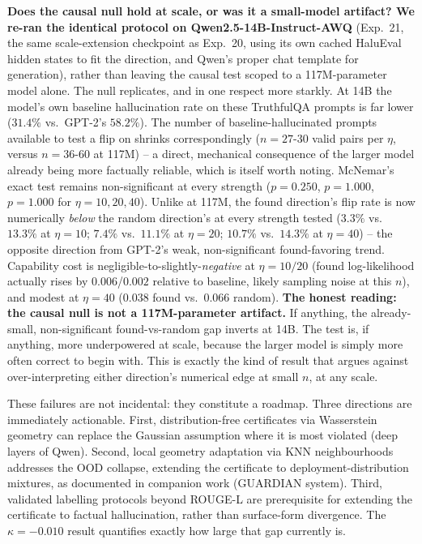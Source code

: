 \documentclass[10pt,twocolumn]{article}
\begin{document}
\textbf{Does the causal null hold at scale, or was it a small-model
artifact? We re-ran the identical protocol on Qwen2.5-14B-Instruct-AWQ}
(Exp.~21, the same scale-extension checkpoint as Exp.~20, using its
own cached HaluEval hidden states to fit the direction, and Qwen's
proper chat template for generation), rather than leaving the causal
test scoped to a 117M-parameter model alone. The null replicates, and
in one respect more starkly. At 14B the model's own baseline
hallucination rate on these TruthfulQA prompts is far lower ($31.4\%$
vs.\ GPT-2's $58.2\%$). The number of baseline-hallucinated prompts
available to test a flip on shrinks correspondingly ($n=27$-$30$ valid
pairs per $\eta$, versus $n=36$-$60$ at 117M) -- a direct, mechanical
consequence of the larger model already being more factually
reliable, which is itself worth noting. McNemar's exact test remains
non-significant at every strength ($p=0.250$, $p=1.000$, $p=1.000$ for
$\eta=10,20,40$). Unlike at 117M, the found direction's flip rate is
now numerically \emph{below} the random direction's at every strength
tested ($3.3\%$ vs.\ $13.3\%$ at $\eta=10$; $7.4\%$ vs.\ $11.1\%$ at
$\eta=20$; $10.7\%$ vs.\ $14.3\%$ at $\eta=40$) -- the opposite
direction from GPT-2's weak, non-significant found-favoring trend.
Capability cost is negligible-to-slightly-\emph{negative} at
$\eta=10/20$ (found log-likelihood actually rises by $0.006$/$0.002$
relative to baseline, likely sampling noise at this $n$), and modest
at $\eta=40$ ($0.038$ found vs.\ $0.066$ random). \textbf{The honest
reading: the causal null is not a 117M-parameter artifact.} If
anything, the already-small, non-significant found-vs-random gap
inverts at 14B. The test is, if anything, more underpowered at scale,
because the larger model is simply more often correct to begin with.
This is exactly the kind of result that argues against
over-interpreting either direction's numerical edge at small $n$, at
any scale.

These failures are not incidental: they constitute a roadmap. Three
directions are immediately actionable.
First, distribution-free certificates via Wasserstein geometry can
replace the Gaussian assumption where it is most violated (deep layers
of Qwen).
Second, local geometry adaptation via KNN neighbourhoods addresses the
OOD collapse, extending the certificate to deployment-distribution
mixtures, as documented in companion work (GUARDIAN system).
Third, validated labelling protocols beyond ROUGE-L are prerequisite
for extending the certificate to factual hallucination, rather than
surface-form divergence. The $\kappa = -0.010$ result quantifies
exactly how large that gap currently is.
\end{document}
